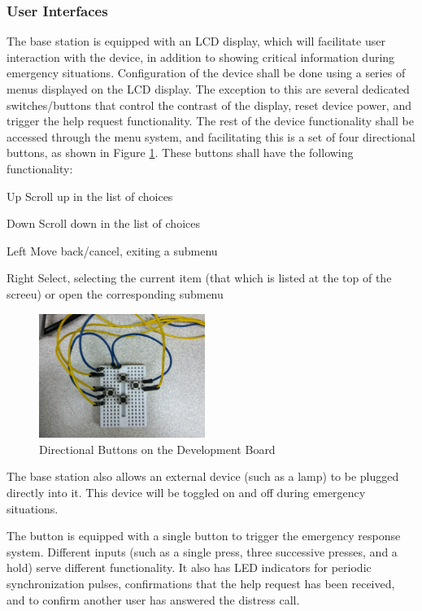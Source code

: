 \documentclass[journal,compsoc]{IEEEtran}
\begin{document}
\subsubsection{User Interfaces}
The base station is equipped with an LCD display, which will facilitate user interaction with the device, in addition to showing critical information during emergency situations. Configuration of the device shall be done using a series of menus displayed on the LCD display. The exception to this are several dedicated switches/buttons that control the contrast of the display, reset device power, and trigger the help request functionality. The rest of the device functionality shall be accessed through the menu system, and facilitating this is a set of four directional buttons, as shown in Figure \ref{dev buttons}. These buttons shall have the following functionality:

\begin{LaTeXdescription}
	\item[Up] Scroll up in the list of choices
    \item[Down] Scroll down in the list of choices
    \item[Left] Move back/cancel, exiting a submenu
    \item[Right] Select, selecting the current item (that which is listed at the top of the screeu) or open the corresponding submenu
\end{LaTeXdescription}

\begin{figure}
	\centering
	\includegraphics[width=0.48\textwidth]{dev_buttons.jpg}
    \caption{Directional Buttons on the Development Board}
    \label{dev buttons}
\end{figure}

The base station also allows an external device (such as a lamp) to be plugged directly into it. This device will be toggled on and off during emergency situations.

The button is equipped with a single button to trigger the emergency response system. Different inputs (such as a single press, three successive presses, and a hold) serve different functionality. It also has LED indicators for periodic synchronization pulses, confirmations that the help request has been received, and to confirm another user has answered the distress call.
\end{document}
